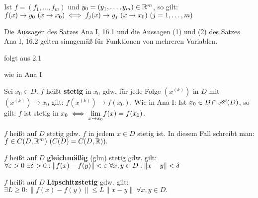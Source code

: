 \documentclass[a4paper,twoside,DIV15,BCOR12mm,chapterprefix=true,headings=twolinechapter]{scrbook}
\begin{document}
\begin{satz}
\begin{liste}
\item Ist $f = (f_1,\ldots,f_m)$ und $y_0 = (y_1,\ldots,y_m) \in \mathbb{R}^m$, so gilt: $f(x) \to y_0\ (x \to x_0) \iff f_j(x) \to y_j\ (x \to x_0)\ (j=1,\ldots,m)$
\item Die Aussagen des Satzes Ana I, 16.1 und die Aussagen (1) und (2) des Satzes Ana I, 16.2 gelten sinngemäß für Funktionen von mehreren Variablen.
\end{liste}
\end{satz}

\begin{beweise}
\item folgt aus 2.1
\item wie in Ana I
\end{beweise}

\begin{definition*}
\begin{liste}
\item {}Sei $x_0 \in D$. $f$ heißt \textbf{stetig} in $x_0$ gdw. für jede Folge $(x^{(k)})$ in $D$ mit $(x^{(k)}) \to x_0$ gilt: $f(x^{(k)}) \to f(x_0)$. Wie in Ana I: Ist $x_0 \in D \cap \mathscr{H}(D)$, so gilt: $f$ ist stetig in $x_0 \iff \displaystyle{\lim_{x \to x_0}} f(x) = f(x_0)$.
\item {}$f$ heißt auf $D$ stetig gdw. $f$ in jedem $x \in D$ stetig ist. In diesem Fall schreibt man: $f \in C(D,\mathbb{R}^m)\ (C(D) = C(D,\mathbb{R})).$
\item {}$f$ heißt auf $D$ \textbf{gleichmäßig} (glm) stetig gdw. gilt:\\
$\forall \varepsilon>0\ \exists \delta>0: \|f(x)-f(y)\| < \varepsilon\ \forall x,y \in D: \|x-y\| < \delta$
\item {}$f$ heißt auf $D$  \textbf{Lipschitzstetig} gdw. gilt:\\
$\exists L\ge0: \|f(x)-f(y)\| \le L\|x-y\|\ \forall x,y \in D.$
\end{liste}
\end{definition*}
\end{document}
